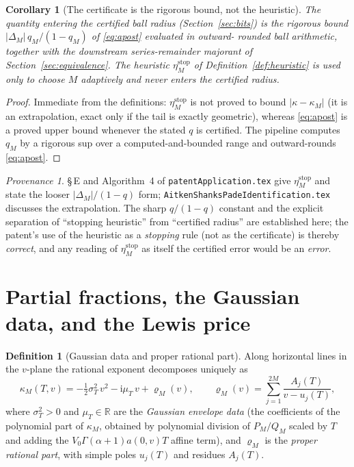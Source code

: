 \documentclass[11pt]{article}
\newcommand{\R}{\mathbb{R}}
\newcommand{\Ii}{\mathrm{i}}
\theoremstyle{plain}
\newtheorem{corollary}[theorem]{Corollary}
\theoremstyle{definition}
\newtheorem{definition}[theorem]{Definition}
\theoremstyle{remark}
\newtheorem*{provenance}{Provenance}
\begin{document}
\begin{corollary}[The certificate is the rigorous bound, not the heuristic]
\label{cor:cert-distinction}
The quantity entering the certified ball radius (Section~\ref{sec:bits}) is the
rigorous bound $|\Delta_M|\,q_M/(1-q_M)$ of \eqref{eq:apost} evaluated in outward-
rounded ball arithmetic, together with the downstream series-remainder majorant
of Section~\ref{sec:equivalence}. The heuristic $\eta_M^{\mathrm{stop}}$ of
Definition~\ref{def:heuristic} is used only to \emph{choose} $M$ adaptively and
never enters the certified radius.
\end{corollary}
\begin{proof}
Immediate from the definitions: $\eta_M^{\mathrm{stop}}$ is not proved to bound
$|\kappa-\kappa_M|$ (it is an extrapolation, exact only if the tail is exactly
geometric), whereas \eqref{eq:apost} is a proved upper bound whenever the stated
$q$ is certified. The pipeline computes $q_M$ by a rigorous sup over a
computed-and-bounded range and outward-rounds \eqref{eq:apost}.
\end{proof}

\begin{provenance}
\S\,E and Algorithm~4 of \texttt{patentApplication.tex} give
$\eta_M^{\mathrm{stop}}$ and state the looser $|\Delta_M|/(1-q)$ form;
\texttt{AitkenShanksPadeIdentification.tex} discusses the extrapolation. The
sharp $q/(1-q)$ constant and the explicit separation of ``stopping heuristic''
from ``certified radius'' are established here; the patent's use of the heuristic
as a \emph{stopping} rule (not as the certificate) is thereby \emph{correct}, and
any reading of $\eta_M^{\mathrm{stop}}$ as itself the certified error would be an
\emph{error}.
\end{provenance}

\section{Partial fractions, the Gaussian data, and the Lewis price}
\label{sec:contour}

\begin{definition}[Gaussian data and proper rational part]\label{def:sigmaT}
Along horizontal lines in the $v$-plane the rational exponent decomposes uniquely
as
\begin{equation}\label{eq:kappa-decomp}
   \kappa_M(T,v)=-\tfrac12\sigma_T^2\,v^2-\Ii\mu_T\,v+\varrho_M(v),
   \qquad
   \varrho_M(v)=\sum_{j=1}^{2M}\frac{A_j(T)}{v-u_j(T)},
\end{equation}
where $\sigma_T^2>0$ and $\mu_T\in\R$ are the \emph{Gaussian envelope data}
(the coefficients of the polynomial part of $\kappa_M$, obtained by polynomial
division of $P_M/Q_M$ scaled by $T$ and adding the $V_0\Gamma(\alpha+1)a(0,v)T$
affine term), and $\varrho_M$ is the \emph{proper rational part}, with simple
poles $u_j(T)$ and residues $A_j(T)$.
\end{definition}
\end{document}

